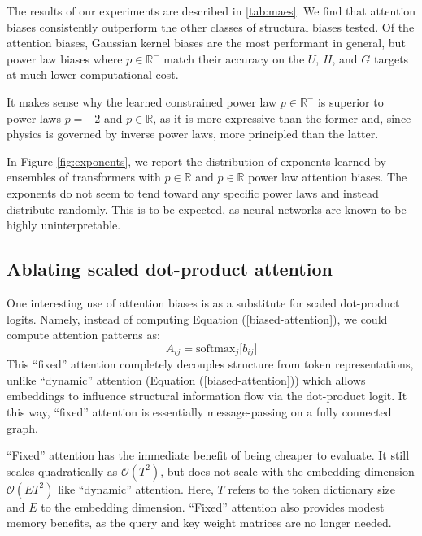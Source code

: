 \documentclass{article}
\begin{document}
The results of our experiments are described in \ref{tab:maes}. We find that attention biases consistently outperform the other classes of structural biases tested. Of the attention biases, Gaussian kernel biases are the most performant in general, but power law biases where $p\in\mathbb{R}^-$ match their accuracy on the $U$, $H$, and $G$ targets at much lower computational cost. 

It makes sense why the learned constrained power law $p \in \mathbb{R}^-$ is superior to power laws $p=-2$ and $p\in\mathbb{R}$, as it is more expressive than the former and, since physics is governed by inverse power laws, more principled than the latter. 

In Figure \ref{fig:exponents}, we report the distribution of exponents learned by ensembles of transformers with $p \in \mathbb{R}$ and $p \in \mathbb{R}$ power law attention biases. The exponents do not seem to tend toward any specific power laws and instead distribute randomly. This is to be expected, as neural networks are known to be highly uninterpretable. 

\subsection{Ablating scaled dot-product attention}

One interesting use of attention biases is as a substitute for scaled dot-product logits. Namely, instead of computing Equation (\ref{biased-attention}), we could compute attention patterns as:
\begin{equation}\label{fixed-attention}
    A_{ij} = \text{softmax}_j \big[ b_{ij} \big]
\end{equation}
This ``fixed'' attention completely decouples structure from token representations, unlike ``dynamic'' attention (Equation (\ref{biased-attention})) which allows embeddings to influence structural information flow via the dot-product logit. It this way, ``fixed'' attention is essentially message-passing on a fully connected graph. 

``Fixed'' attention has the immediate benefit of being cheaper to evaluate. It still scales quadratically as $\mathcal{O}(T^2)$, but does not scale with the embedding dimension $\mathcal{O}(ET^2)$ like ``dynamic'' attention. Here, $T$ refers to the token dictionary size and $E$ to the embedding dimension. ``Fixed'' attention also provides modest memory benefits, as the query and key weight matrices are no longer needed. 
\end{document}
